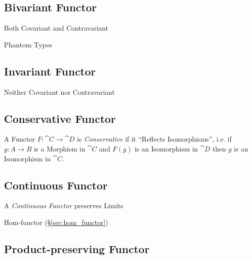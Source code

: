 \subsection{Bivariant Functor} \label{sec:bivariant_functor}

Both Covariant and Contravariant

Phantom Types %



\subsection{Invariant Functor} \label{sec:invariant_functor}

Neither Covariant nor Contravariant



\subsection{Conservative Functor}\label{sec:conservative_functor}

A Functor $F : \cat{C} \rightarrow \cat{D}$ is
\emph{Conservative} if it ``Reflects Isomorphisms'', i.e. if $g : A
\rightarrow B$ is a Morphism in $\cat{C}$ and $F(g)$ is an
Isomorphism in $\cat{D}$ then $g$ is an Isomorphism in
$\cat{C}$.



\subsection{Continuous Functor}\label{sec:continuous_functor}

A \emph{Continuous Functor} preserves Limits

Hom-functor (\S\ref{sec:hom_functor})



\subsection{Product-preserving Functor}
\label{sec:product_preserving_functor}

